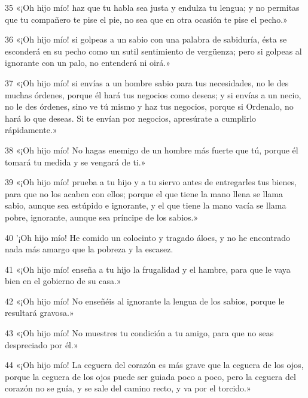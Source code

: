 \par 35 «¡Oh hijo mío! haz que tu habla sea justa y endulza tu lengua; y no permitas que tu compañero te pise el pie, no sea que en otra ocasión te pise el pecho.»

\par 36 «¡Oh hijo mío! si golpeas a un sabio con una palabra de sabiduría, ésta se esconderá en su pecho como un sutil sentimiento de vergüenza; pero si golpeas al ignorante con un palo, no entenderá ni oirá.»

\par 37 «¡Oh hijo mío! si envías a un hombre sabio para tus necesidades, no le des muchas órdenes, porque él hará tus negocios como deseas; y si envías a un necio, no le des órdenes, sino ve tú mismo y haz tus negocios, porque si Ordenalo, no hará lo que deseas. Si te envían por negocios, apresúrate a cumplirlo rápidamente.»

\par 38 «¡Oh hijo mío! No hagas enemigo de un hombre más fuerte que tú, porque él tomará tu medida y se vengará de ti.»

\par 39 «¡Oh hijo mío! prueba a tu hijo y a tu siervo antes de entregarles tus bienes, para que no los acaben con ellos; porque el que tiene la mano llena se llama sabio, aunque sea estúpido e ignorante, y el que tiene la mano vacía se llama pobre, ignorante, aunque sea príncipe de los sabios.»

\par 40 '¡Oh hijo mío! He comido un colocinto y tragado áloes, y no he encontrado nada más amargo que la pobreza y la escasez.

\par 41 «¡Oh hijo mío! enseña a tu hijo la frugalidad y el hambre, para que le vaya bien en el gobierno de su casa.»

\par 42 «¡Oh hijo mío! No enseñéis al ignorante la lengua de los sabios, porque le resultará gravosa.»

\par 43 «¡Oh hijo mío! No muestres tu condición a tu amigo, para que no seas despreciado por él.»

\par 44 «¡Oh hijo mío! La ceguera del corazón es más grave que la ceguera de los ojos, porque la ceguera de los ojos puede ser guiada poco a poco, pero la ceguera del corazón no se guía, y se sale del camino recto, y va por el torcido.»

